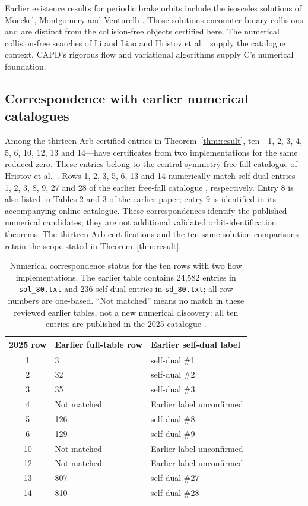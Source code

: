 \documentclass[10pt,a4paper]{article}
\theoremstyle{remark}
\begin{document}
Earlier existence results for periodic brake orbits include the
isosceles solutions of Moeckel, Montgomery and Venturelli
\cite[Theorem 2 and Section 5]{BrakeSyzygy}. Those solutions encounter
binary collisions and are distinct from the collision-free objects
certified here. The numerical collision-free searches of Li and Liao
\cite{LiLiao} and Hristov et al.\ \cite{Revisited,Hristov} supply the
catalogue context. CAPD's rigorous flow and variational algorithms
\cite{CAPD} supply C's numerical foundation.

\subsection{Correspondence with earlier numerical catalogues}
Among the thirteen Arb-certified entries in Theorem~\ref{thm:result},
ten---1, 2, 3, 4, 5, 6, 10, 12, 13 and 14---have certificates from two
implementations for the same reduced zero. These entries belong to the
central-symmetry free-fall catalogue of Hristov et al.\
\cite{Hristov,Data}. Rows 1, 2, 3, 5, 6, 13 and 14 numerically
match self-dual entries 1, 2, 3, 8, 9, 27 and 28 of the earlier free-fall
catalogue \cite{Revisited,FreeData}, respectively. Entry 8 is also listed
in Tables 2 and 3 of the earlier paper; entry 9 is identified in its
accompanying online catalogue. These correspondences identify the
published numerical candidates; they are not additional
validated orbit-identification theorems. The thirteen Arb certifications
and the ten same-solution comparisons retain the scope stated in
Theorem~\ref{thm:result}.

\begin{table}[htbp]
\centering\small
\begin{tabular}{@{}cp{.28\linewidth}p{.48\linewidth}@{}}
\toprule
2025 row & Earlier full-table row & Earlier self-dual label\\
\midrule
1 & 3 & self-dual \#1\\
2 & 32 & self-dual \#2\\
3 & 35 & self-dual \#3\\
4 & Not matched & Earlier label unconfirmed\\
5 & 126 & self-dual \#8\\
6 & 129 & self-dual \#9\\
10 & Not matched & Earlier label unconfirmed\\
12 & Not matched & Earlier label unconfirmed\\
13 & 807 & self-dual \#27\\
14 & 810 & self-dual \#28\\
\bottomrule
\end{tabular}
\caption{Numerical correspondence status for the ten rows with two flow
implementations. The earlier table \cite{FreeData} contains 24,582
entries in \texttt{sol\_80.txt} and 236 self-dual entries in
\texttt{sd\_80.txt}; all row numbers are one-based. ``Not matched'' means
no match in these reviewed earlier tables, not a new numerical discovery:
all ten entries are published in the 2025 catalogue \cite{Data}.}
\label{tab:crosswalk}
\end{table}
\end{document}
